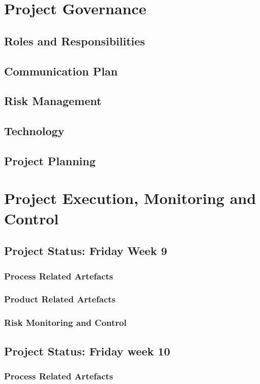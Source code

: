 \documentclass{report}
\begin{document}
\chapter{Project Governance}
\section{Roles and Responsibilities}
\section{Communication Plan}
\section{Risk Management}
\section{Technology}
\section{Project Planning}
\section{}

\chapter{Project Execution, Monitoring and Control}
\section{Project Status: Friday Week 9}
\subsection{Process Related Artefacts}
\subsection{Product Related Artefacts}
\subsection{Risk Monitoring and Control}
\section{Project Status: Friday week 10}
\subsection{Process Related Artefacts}
\end{document}
